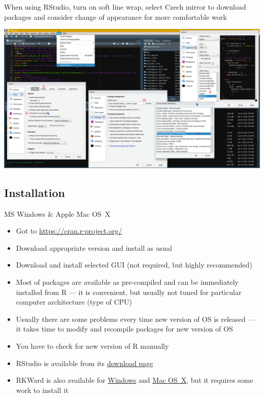 \documentclass[compress, ucs, xelatex, 11pt, xcolor=svgnames,
  hyperref={
    bookmarks=true,
    unicode=true,
    colorlinks=true,
    pdftitle={Molecular data in R},
    plainpages=false,
    pdfauthor={Vojtech Zeisek},
    pdfsubject={Course about phylogeny and evolution in R},
    pdfcreator={XeLaTeX},
    pdfkeywords={R, evolution, phylogeny, molecular data},
    linkcolor=Tomato,
    anchorcolor=SaddleBrown,
    citecolor=Goldenrod,
    filecolor=DarkMagenta,
    menucolor=Sienna,
    urlcolor=DarkTurquoise,
    pdftex},
  url={hyphens, lowtilde} %
  ]{beamer}
\begin{document}
\begin{frame}{When using RStudio, turn on soft line wrap, select Czech mirror to download packages and consider change of appearance for more comfortable work}
  \begin{center}
    \includegraphics[width=\textwidth-1.5cm]{rstudio_settings.png}
  \end{center}
\end{frame}

\subsection{Installation}

\begin{frame}{MS Windows \& Apple Mac OS~X}
  \begin{itemize}
    \item Got to \url{https://cran.r-project.org/}
    \item Download appropriate version and install as usual
    \item Download and install selected GUI (not required, but highly recommended)
    \item Most of packages are available as pre-compiled and can be immediately installed from R --- it is convenient, but usually not tuned for particular computer architecture (type of CPU)
    \item Usually there are some problems every time new version of OS is released --- it takes time to modify and recompile packages for new version of OS
    \item You have to check for new version of R manually
    \item RStudio is available from its \href{https://www.rstudio.com/products/rstudio/download/\#download}{download page}
    \item RKWard is also available for \href{https://rkward.kde.org/RKWard_on_Windows}{Windows} and \href{https://rkward.kde.org/RKWard_on_Mac}{Mac OS~X}, but it requires some work to install it
  \end{itemize}
\end{frame}
\end{document}
